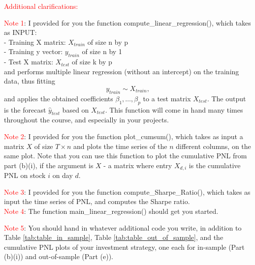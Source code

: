 \documentclass[12pt]{article}
\begin{document}
\FloatBarrier

\textcolor{red}{Additional clarifications:}

\textcolor{red}{Note 1}: I provided for you the function  compute\_linear\_regression(), 
which takes as INPUT: \\
- Training X matrix: $X_{train}$  of size n by p\\
- Training y vector: $y_{train}$  of size n by 1\\
- Test X matrix: $X_{test}$  of size k by p\\
and performs multiple linear regression (without an intercept) on the training data, thus fitting 
	$$y_{train} \sim X_{train},$$
and applies the obtained coefficients $\beta_1,\ldots,\beta_p$ to a test matrix $X_{test}$. The output is the forecast $\hat{y}_{test}$ based on $X_{test}$.
This function will come in hand many times throughout the course, and especially in your projects. 

\textcolor{red}{Note 2}: I provided for you the function  
plot\_cumsum(),
which takes as input a matrix $X$ of size $T \times n$ and plots the time series of the $n$ different columns, on the same plot. Note that you can use this function to plot the cumulative PNL from part (b)(i), if the argument is $X$ - a matrix where entry $X_{d,i}$ is the cumulative PNL on stock $i$ on day $d$. 


\textcolor{red}{Note 3}: I provided for you the function  
compute\_Sharpe\_Ratio(),
which takes as input the time series of PNL, and computes the Sharpe ratio. \\


\textcolor{red}{Note 4}: The function  
main\_linear\_regression() should get you started.

\textcolor{red}{Note 5}: You should hand in whatever additional code you write, in addition to Table \ref{tab:table_in_sample},  Table \ref{tab:table_out_of_sample}, and the cumulative PNL plots of your investment strategy, one each for in-sample (Part (b)(i)) and out-of-sample (Part (e)).
\end{document}
